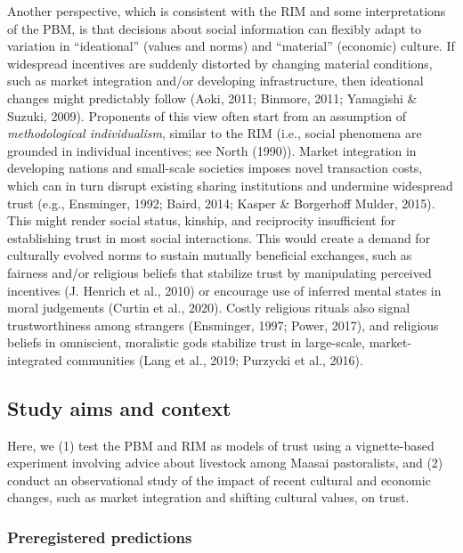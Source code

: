 \documentclass[
  11pt,
]{article}
\begin{document}
Another perspective, which is consistent with the RIM and some
interpretations of the PBM, is that decisions about social information
can flexibly adapt to variation in ``ideational'' (values and norms) and
``material'' (economic) culture. If widespread incentives are suddenly
distorted by changing material conditions, such as market integration
and/or developing infrastructure, then ideational changes might
predictably follow (Aoki, 2011; Binmore, 2011; Yamagishi \& Suzuki,
2009). Proponents of this view often start from an assumption of
\emph{methodological individualism}, similar to the RIM (i.e., social
phenomena are grounded in individual incentives; see North (1990)).
Market integration in developing nations and small-scale societies
imposes novel transaction costs, which can in turn disrupt existing
sharing institutions and undermine widespread trust (e.g., Ensminger,
1992; Baird, 2014; Kasper \& Borgerhoff Mulder, 2015). This might render
social status, kinship, and reciprocity insufficient for establishing
trust in most social interactions. This would create a demand for
culturally evolved norms to sustain mutually beneficial exchanges, such
as fairness and/or religious beliefs that stabilize trust by
manipulating perceived incentives (J. Henrich et al., 2010) or encourage
use of inferred mental states in moral judgements (Curtin et al., 2020).
Costly religious rituals also signal trustworthiness among strangers
(Ensminger, 1997; Power, 2017), and religious beliefs in omniscient,
moralistic gods stabilize trust in large-scale, market-integrated
communities (Lang et al., 2019; Purzycki et al., 2016).

\hypertarget{study-aims-and-context}{%
\subsection{Study aims and context}\label{study-aims-and-context}}

Here, we (1) test the PBM and RIM as models of trust using a
vignette-based experiment involving advice about livestock among Maasai
pastoralists, and (2) conduct an observational study of the impact of
recent cultural and economic changes, such as market integration and
shifting cultural values, on trust.

\hypertarget{preregistered-predictions}{%
\subsubsection{Preregistered
predictions}\label{preregistered-predictions}}
\end{document}
